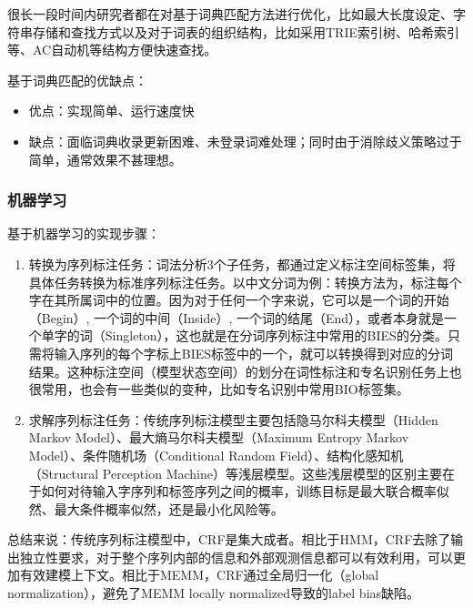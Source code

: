 很长一段时间内研究者都在对基于词典匹配方法进行优化，比如最大长度设定、字符串存储和查找方式以及对于词表的组织结构，比如采用TRIE索引树\cite{yang2012enhanced}、哈希索引\cite{li2003new}等、AC自动机\cite{ngword}等结构方便快速查找。

基于词典匹配的优缺点：
\begin{itemize}
\item 优点：实现简单、运行速度快
\item 缺点：面临词典收录更新困难、未登录词难处理；同时由于消除歧义策略过于简单，通常效果不甚理想。
\end{itemize}

\subsubsection{机器学习}
\noindent
基于机器学习的实现步骤：

\begin{enumerate}
\item 转换为序列标注任务：词法分析3个子任务，都通过定义标注空间标签集，将具体任务转换为标准序列标注任务。以中文分词为例：转换方法为，标注每个字在其所属词中的位置。因为对于任何一个字来说，它可以是一个词的开始（Begin）, 一个词的中间（Inside）, 一个词的结尾（End），或者本身就是一个单字的词（Singleton），这也就是在分词序列标注中常用的BIES的分类。只需将输入序列的每个字标上BIES标签中的一个，就可以转换得到对应的分词结果。这种标注空间（模型状态空间）的划分在词性标注和专名识别任务上也很常用，也会有一些类似的变种，比如专名识别中常用BIO标签集。
\item 求解序列标注任务：传统序列标注模型主要包括隐马尔科夫模型（Hidden Markov Model）\cite{zhang2003chinese}\cite{kupiec1992robust}\cite{yu2006chinese}\cite{morwal2012named}、最大熵马尔科夫模型（Maximum Entropy Markov Model）\cite{mccallum2000maximum}\cite{ratnaparkhi1996maximum}\cite{borthwick1999maximum}、条件随机场（Conditional Random Field）\cite{zhao2006improved}\cite{constant2011mwu}\cite{ekbal2008named}、结构化感知机（Structural Perception Machine）\cite{zhang2007chinese}\cite{zhang2008joint}等浅层模型。这些浅层模型的区别主要在于如何对待输入字序列和标签序列之间的概率，训练目标是最大联合概率似然、最大条件概率似然，还是最小化风险等。
\end{enumerate}

总结来说：传统序列标注模型中，CRF是集大成者。相比于HMM，CRF去除了输出独立性要求，对于整个序列内部的信息和外部观测信息都可以有效利用，可以更加有效建模上下文。相比于MEMM，CRF通过全局归一化（global normalization），避免了MEMM locally normalized导致的label bias缺陷。

